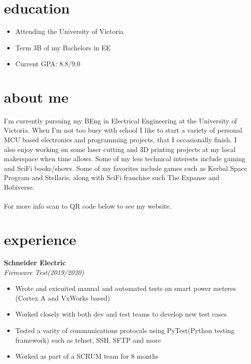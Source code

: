 \documentclass{article}
\newcommand{\minicolumns}[2]{
  \begin{minipage}[t]{0.25\textwidth}
    \begin{flushright}
      #1
    \end{flushright}
  \end{minipage}
  \hfill
  \begin{minipage}[t]{0.7\textwidth}
    #2
  \end{minipage}
}
\newcommand{\resumeSection}[3]{
  \minicolumns{
      \textbf{#1}\\
      \textit{#2}
    }
    {
      \begin{itemize}[leftmargin=*]
          \justifying
          \setlength\itemsep{-0.1em}
          #3
      \end{itemize}
  }
  \vspace{0.5\baselineskip}
}
\begin{document}
\begin{minipage}[t]{0.34\textwidth}
  \section{education}
  \begin{itemize}[leftmargin=*]
    \setlength\itemsep{-0.1em}
    \item Attending the University of Victoria
    \item Term 3B of my Bachelors in EE
    \item Current GPA: 8.8/9.0
  \end{itemize}

  \section{about me}
  \paragraph{}
  \raggedright
  I'm currently pursuing my BEng in Electrical Engineering at the University of Victoria. When I'm not too busy with school I like to start a variety of personal MCU based electronics and programming projects, that I occasionally finish. I also enjoy working on some laser cutting and 3D printing projects at my local makerspace when time allows. Some of my less technical interests include gaming and SciFi books/shows. Some of my favorites include games such as Kerbal Space Program and Stellaris, along with SciFi franchise such The Expanse and Bobiverse.
  \paragraph{}
  For more info scan to QR code below to see my website.

  \vspace*{3em}
  \centering



\end{minipage}

\section{experience}
\resumeSection{Schneider Electric}{Firmware Test(2019/2020)}{
  \item Wrote and exicuited manual and automated tests on smart power meteres (Cortex A and VxWorks based)
  \item Worked closely with both dev and test teams to develop new test cases
  \item Tested a varity of communications protocals using PyTest(Python testing framework) such as telnet, SSH, SFTP and more
  \item Worked as part of a SCRUM team for 8 months
}
\end{document}
